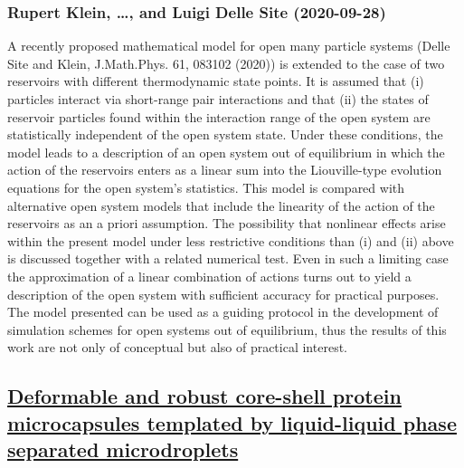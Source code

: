 \subsubsection*{Rupert Klein, \dots, and Luigi Delle Site (2020-09-28)}
A recently proposed mathematical model for open many particle systems (Delle
Site and Klein, J.Math.Phys. 61, 083102 (2020)) is extended to the case of two
reservoirs with different thermodynamic state points. It is assumed that (i)
particles interact via short-range pair interactions and that (ii) the states
of reservoir particles found within the interaction range of the open system
are statistically independent of the open system state. Under these conditions,
the model leads to a description of an open system out of equilibrium in which
the action of the reservoirs enters as a linear sum into the Liouville-type
evolution equations for the open system's statistics. This model is compared
with alternative open system models that include the linearity of the action of
the reservoirs as an a priori assumption. The possibility that nonlinear
effects arise within the present model under less restrictive conditions than
(i) and (ii) above is discussed together with a related numerical test. Even in
such a limiting case the approximation of a linear combination of actions turns
out to yield a description of the open system with sufficient accuracy for
practical purposes. The model presented can be used as a guiding protocol in
the development of simulation schemes for open systems out of equilibrium, thus
the results of this work are not only of conceptual but also of practical
interest.

\subsection*{\href{http://arxiv.org/abs/2009.13413v1}{Deformable and robust core-shell protein microcapsules templated by  liquid-liquid phase separated microdroplets}}
